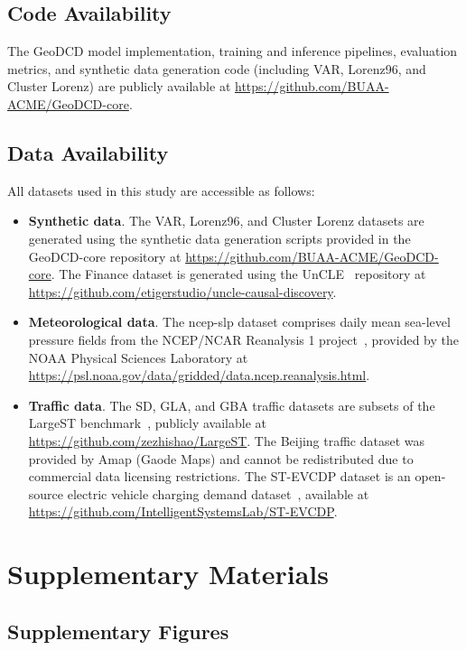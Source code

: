 \documentclass{article}
\begin{document}
\subsection*{Code Availability}
The GeoDCD model implementation, training and inference pipelines, evaluation metrics, and synthetic data generation code (including VAR, Lorenz96, and Cluster Lorenz) are publicly available at \url{https://github.com/BUAA-ACME/GeoDCD-core}.

\subsection*{Data Availability}
All datasets used in this study are accessible as follows:

\begin{itemize}
    \item \textbf{Synthetic data}. The VAR, Lorenz96, and Cluster Lorenz datasets are generated using the synthetic data generation scripts provided in the GeoDCD-core repository at \url{https://github.com/BUAA-ACME/GeoDCD-core}. The Finance dataset is generated using the UnCLE~\cite{bi_uncle_2025} repository at \url{https://github.com/etigerstudio/uncle-causal-discovery}.
    \item \textbf{Meteorological data}. The ncep-slp dataset comprises daily mean sea-level pressure fields from the NCEP/NCAR Reanalysis 1 project~\cite{kalnay1996ncep}, provided by the NOAA Physical Sciences Laboratory at \url{https://psl.noaa.gov/data/gridded/data.ncep.reanalysis.html}.
    \item \textbf{Traffic data}. The SD, GLA, and GBA traffic datasets are subsets of the LargeST benchmark~\cite{liu2023largest}, publicly available at \url{https://github.com/zezhishao/LargeST}. The Beijing traffic dataset was provided by Amap (Gaode Maps) and cannot be redistributed due to commercial data licensing restrictions. The ST-EVCDP dataset is an open-source electric vehicle charging demand dataset~\cite{qu2024stevcdp}, available at \url{https://github.com/IntelligentSystemsLab/ST-EVCDP}.
\end{itemize} 

\section*{Supplementary Materials}

\subsection*{Supplementary Figures}
\end{document}
